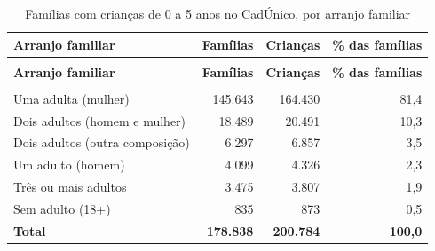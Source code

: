 \begin{apendicesenv}
{\small\setlength{\tabcolsep}{5pt}
\begin{longtable}{@{}>{\raggedright\arraybackslash}p{3.6cm}rrr@{}}
\caption{Famílias com crianças de 0 a 5 anos no CadÚnico, por arranjo familiar}\label{tab:cadunico-familias-por-arranjo-2026}\\
\toprule \textbf{Arranjo familiar} & \textbf{Famílias} & \textbf{Crianças} & \parbox[b]{2.20cm}{\raggedleft{} \textbf{\% das famílias}} \\ \midrule \endfirsthead
{}\\ \toprule \textbf{Arranjo familiar} & \textbf{Famílias} & \textbf{Crianças} & \parbox[b]{2.20cm}{\raggedleft{} \textbf{\% das famílias}} \\ \midrule \endhead
\midrule {}\\ \endfoot
\bottomrule \endlastfoot
Uma adulta (mulher) & 145.643 & 164.430 & 81,4 \\
Dois adultos (homem e mulher) & 18.489 & 20.491 & 10,3 \\
Dois adultos (outra composição) & 6.297 & 6.857 & 3,5 \\
Um adulto (homem) & 4.099 & 4.326 & 2,3 \\
Três ou mais adultos & 3.475 & 3.807 & 1,9 \\
Sem adulto (18+) & 835 & 873 & 0,5 \\
\textbf{Total} & \textbf{178.838} & \textbf{200.784} & \textbf{100,0} \\
\end{longtable}}
\vspace{-6pt}



\end{apendicesenv}
